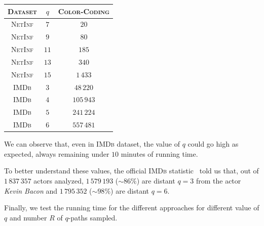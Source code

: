 \begin{table}[h]
	\centering
	\begin{tabular}{|c|c|c|}
		\hline
		\textsc{Dataset} & $q$  & \textsc{Color-Coding} \\ \hline \hline
		\textsc{NetInf}  & $7$  & $20$                  \\ \hline
		\textsc{NetInf}  & $9$  & $80$                  \\ \hline
		\textsc{NetInf}  & $11$ & $185$                 \\ \hline
		\textsc{NetInf}  & $13$ & $340$                 \\ \hline
		\textsc{NetInf}  & $15$ & $1\,433$              \\ \hline \hline
		\textsc{IMDb}    & $3$  & $48\,220$             \\ \hline
		\textsc{IMDb}    & $4$  & $105\,943$            \\ \hline
		\textsc{IMDb}    & $5$  & $241\,224$            \\ \hline
		\textsc{IMDb}    & $6$  & $557\,481$            \\ \hline
	\end{tabular}
\end{table}

We can observe that, even in \textsc{IMDb} dataset, the value of $q$ could go high as expected, always remaining under $10$ minutes of running time. \medskip

To better understand these values, the official \textsc{IMDb} statistic~\cite{imdbstat} told us that, out of $1\,837\,357$ actors analyzed, $1\,579\,193$ ($\sim86\%$) are distant $q=3$ from the actor \textit{Kevin Bacon} and $1\,795\,352$ ($\sim98\%$) are distant $q=6$.\medskip

Finally, we test the running time for the different approaches for different value of $q$ and number $R$ of $q$-paths sampled. 

